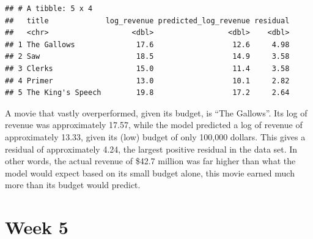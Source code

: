 \documentclass[
]{article}
\newenvironment{Shaded}{\begin{snugshade}}{\end{snugshade}}
\newcommand{\AttributeTok}[1]{\textcolor[rgb]{0.13,0.29,0.53}{#1}}
\newcommand{\CommentTok}[1]{\textcolor[rgb]{0.56,0.35,0.01}{\textit{#1}}}
\newcommand{\DecValTok}[1]{\textcolor[rgb]{0.00,0.00,0.81}{#1}}
\newcommand{\FunctionTok}[1]{\textcolor[rgb]{0.13,0.29,0.53}{\textbf{#1}}}
\newcommand{\NormalTok}[1]{#1}
\newcommand{\OtherTok}[1]{\textcolor[rgb]{0.56,0.35,0.01}{#1}}
\newcommand{\SpecialCharTok}[1]{\textcolor[rgb]{0.81,0.36,0.00}{\textbf{#1}}}
\begin{document}
\begin{Shaded}
\end{Shaded}

\begin{verbatim}
## # A tibble: 5 x 4
##   title             log_revenue predicted_log_revenue residual
##   <chr>                   <dbl>                 <dbl>    <dbl>
## 1 The Gallows              17.6                  12.6     4.98
## 2 Saw                      18.5                  14.9     3.58
## 3 Clerks                   15.0                  11.4     3.58
## 4 Primer                   13.0                  10.1     2.82
## 5 The King's Speech        19.8                  17.2     2.64
\end{verbatim}

A movie that vastly overperformed, given its budget, is ``The Gallows''.
Its log of revenue was approximately 17.57, while the model predicted a
log of revenue of approximately 13.33, given its (low) budget of only
100,000 dollars. This gives a residual of approximately 4.24, the
largest positive residual in the data set. In other words, the actual
revenue of \$42.7 million was far higher than what the model would
expect based on its small budget alone, this movie earned much more than
its budget would predict.

\section{Week 5}\label{week-5}
\end{document}
